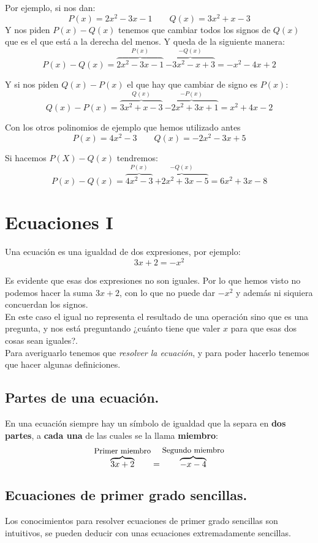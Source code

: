 \documentclass[a4paper,11pt,answers]{exam}
\begin{document}
    Por ejemplo, si nos dan:
    \[P(x) = 2x^2 - 3x -1 \quad\quad Q(x)= 3x^2 + x - 3\]
    Y nos piden $P(x) - Q(x)$ tenemos que cambiar todos los signos de $Q(x)$ que es el que está a la derecha del menos. Y queda de la siguiente manera:
    \[P(x) -Q(x) = \overbrace{2x^2 - 3x -1}^{P(x)} \ \overbrace{-3x^2-x+3}^{-Q(x)}
      = -x^2 - 4x + 2\]

    Y si nos piden $Q(x) - P(x)$ el que hay que cambiar de signo es $P(x)$:
    \[Q(x) - P(x) = \overbrace{3x^2 + x - 3}^{Q(x)}\ \overbrace{-2x^2+3x+1}^{-P(x)}
      =x^2 + 4x -2\]

    Con los otros polinomios de ejemplo que hemos utilizado antes
    \[P(x) = 4x^2 - 3\quad\quad Q(x) = -2x^2 - 3x +5\]

    Si hacemos $P(X) - Q(x)$ tendremos:
    \[P(x) - Q(x) = \overbrace{4x^2 - 3}^{P(x)} \ \overbrace{+2x^2 + 3x - 5}^{-Q(x)}
      = 6x^2 + 3x -8\]


  \section{Ecuaciones I} \label{ecs_sencillas}
  Una ecuación es una igualdad de dos expresiones, por ejemplo:
  \[3x + 2 = -x^2\]

  Es evidente que esas dos expresiones no son iguales. Por lo que hemos visto no podemos hacer la suma $3x + 2$, con lo que no puede dar $-x^2$ y además ni siquiera concuerdan los signos.\\

  En este caso el igual no representa el resultado de una operación sino que es una pregunta, y nos está preguntando ¿cuánto tiene que valer $x$ para que esas dos cosas sean iguales?.\\
  Para averiguarlo tenemos que \emph{resolver la ecuación}, y para poder hacerlo tenemos que hacer algunas definiciones.
  \subsection{Partes de una ecuación.}
  En una ecuación siempre hay un símbolo de igualdad que la separa en \textbf{dos partes}, a \textbf{cada una} de las cuales se la llama \textbf{miembro}:
  \[\overbrace{3x + 2 }^{\text{\small Primer miembro}}=\overbrace{-x-4}^{\text{\small Segundo miembro}}\]


  \subsection{Ecuaciones de primer grado sencillas.}
  Los conocimientos para resolver ecuaciones de primer grado sencillas son intuitivos, se pueden deducir con unas ecuaciones extremadamente sencillas.\\
\end{document}
